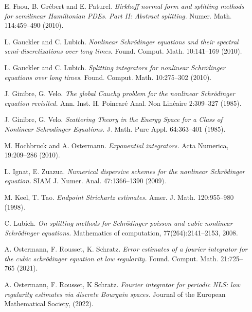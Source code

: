 \documentclass[10pt,a4paper]{article}
\begin{document}
\begin{thebibliography}{99}
      {\rm E. Faou, B. Grébert and E. Paturel.} 
      {\em Birkhoff normal form and splitting methods for semilinear Hamiltonian PDEs. Part II: Abstract splitting.}
      Numer. Math. 114:459--490 (2010).

      {\rm L. Gauckler and C. Lubich.}
      {\em Nonlinear Schr\"odinger equations and their spectral semi-discretizations over long times.}
      Found. Comput. Math. 10:141--169 (2010).

      {\rm L. Gauckler and C. Lubich.}
      {\em Splitting integrators for nonlinear Schrödinger equations over long times.}
      Found. Comput. Math. 10:275--302 (2010).

      {\rm J. Ginibre, G. Velo.}
      {\em The global Cauchy problem for the nonlinear Schr\"odinger equation revisited.}
      Ann. Inst. H. Poincar\'e Anal. Non Lin\'eaire 2:309--327 (1985).

      {\rm J. Ginibre, G. Velo.}
      {\em Scattering Theory in the Energy Space for a Class of Nonlinear Schrodinger Equations.}
      J. Math. Pure Appl. 64:363--401 (1985).

      {\rm M. Hochbruck and A. Ostermann.}
      {\em Exponential integrators.}
      Acta Numerica, 19:209--286 (2010).

      {\rm L. Ignat, E. Zuazua.}
      {\em Numerical dispersive schemes for the nonlinear Schr\"odinger equation.}
      SIAM J. Numer. Anal. 47:1366--1390 (2009).

      {\rm M. Keel, T. Tao.}
      {\em Endpoint Strichartz estimates.}
      Amer. J. Math. 120:955--980 (1998).

      {\rm C. Lubich.}
      {\em On splitting methods for Schr\"odinger-poisson and cubic nonlinear Schr\"odinger equations.}
      Mathematics of computation, 77(264):2141--2153, 2008.

      {\rm A. Ostermann, F. Rousset, K. Schratz.}
      {\em Error estimates of a fourier integrator for the cubic schr\"odinger equation at low regularity.}
      Found. Comput. Math. 21:725--765 (2021).

      {\rm A. Ostermann, F. Rousset, K Schratz.}
      {\em Fourier integrator for periodic NLS: low regularity estimates via discrete Bourgain spaces.}
      Journal of the European Mathematical Society, (2022).


\end{thebibliography}
\end{document}
